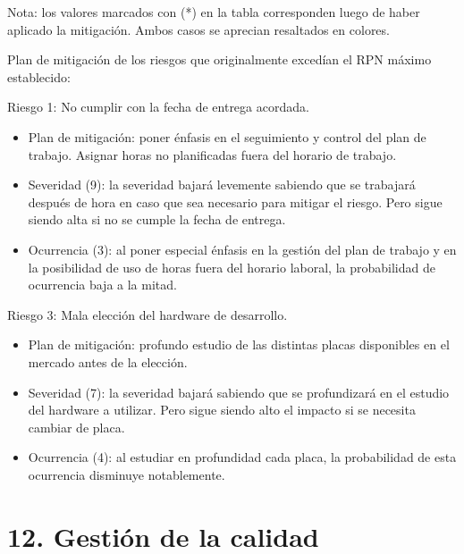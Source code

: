 \documentclass[
11pt, %
]{charter}
\begin{document}
Nota: los valores marcados con (*) en la tabla corresponden luego de haber aplicado la mitigación. Ambos casos se aprecian resaltados en colores.

\pagebreak

Plan de mitigación de los riesgos que originalmente excedían el RPN máximo establecido:
 
Riesgo 1: No cumplir con la fecha de entrega acordada.
\begin{itemize}
	\item Plan de mitigación: poner énfasis en el seguimiento y control del plan de trabajo. Asignar horas no planificadas fuera del horario de trabajo.
	\item Severidad (9): la severidad bajará levemente sabiendo que se trabajará después de hora en caso que sea necesario para mitigar el riesgo. Pero sigue siendo alta si no se cumple la fecha de entrega.
	\item Ocurrencia (3): al poner especial énfasis en la gestión del plan de trabajo y en la posibilidad de uso de horas fuera del horario laboral, la probabilidad de ocurrencia baja a la mitad.
\end{itemize}

Riesgo 3: Mala elección del hardware de desarrollo.
\begin{itemize}
	\item Plan de mitigación: profundo estudio de las distintas placas disponibles en el mercado antes de la elección.
	\item Severidad (7): la severidad bajará sabiendo que se profundizará en el estudio del hardware a utilizar. Pero sigue siendo alto el impacto si se necesita cambiar de placa.
	\item Ocurrencia (4): al estudiar en profundidad cada placa, la probabilidad de esta ocurrencia disminuye notablemente.
\end{itemize}

\section{12. Gestión de la calidad}
\label{sec:calidad}
\end{document}
